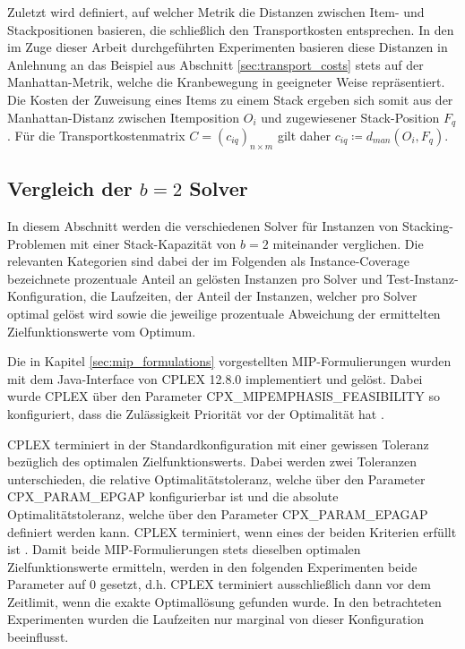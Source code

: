 Zuletzt wird definiert, auf welcher Metrik die Distanzen zwischen Item- und Stackpositionen
basieren, die schließlich den Transportkosten entsprechen.
In den im Zuge dieser Arbeit durchgeführten Experimenten basieren diese Distanzen in Anlehnung an das Beispiel
aus Abschnitt \ref{sec:transport_costs} stets auf der Manhattan-Metrik, welche die Kranbewegung in geeigneter Weise repräsentiert. Die Kosten der Zuweisung eines Items zu einem Stack ergeben sich somit aus der Manhattan-Distanz zwischen Itemposition $O_i$ und zugewiesener Stack-Position $F_q$. Für die Transportkostenmatrix $C = (c_{iq})_{n \times m}$ gilt
daher $c_{iq} \coloneqq d_{man}(O_i, F_q)$.

\subsection{Vergleich der $b = 2$ Solver}
\label{sec:solver_comp_b=2}

In diesem Abschnitt werden die verschiedenen Solver für Instanzen von Stacking-Problemen mit einer Stack-Kapazität von $b=2$ miteinander verglichen. Die relevanten Kategorien sind dabei der im Folgenden als Instance-Coverage bezeichnete prozentuale Anteil an gelösten Instanzen pro Solver und Test-Instanz-Konfiguration, die Laufzeiten, der Anteil der Instanzen, welcher pro Solver optimal gelöst wird
sowie die jeweilige prozentuale Abweichung der ermittelten Zielfunktionswerte vom Optimum.

Die in Kapitel \ref{sec:mip_formulations} vorgestellten MIP-Formulierungen wurden mit dem Java-Interface von CPLEX 12.8.0 implementiert
und gelöst. Dabei wurde CPLEX über den Parameter \textsc{CPX\_MIPEMPHASIS\_FEASIBILITY} so konfiguriert, dass die Zulässigkeit
Priorität vor der Optimalität hat \cite{IBM_DOC}.

CPLEX terminiert in der Standardkonfiguration mit einer gewissen Toleranz bezüglich des optimalen Zielfunktionswerts.
Dabei werden zwei Toleranzen unterschieden, die relative Optimalitätstoleranz, welche über den Parameter
\textsc{CPX\_PARAM\_EPGAP} konfigurierbar ist und die absolute Optimalitätstoleranz, welche über den Parameter
\textsc{CPX\_PARAM\_EPAGAP} definiert werden kann. CPLEX terminiert, wenn eines der beiden Kriterien erfüllt ist \cite{CPLEX2015}.
Damit beide MIP-Formulierungen stets dieselben optimalen Zielfunktionswerte ermitteln, werden in den folgenden
Experimenten beide Parameter auf $0$ gesetzt, d.h. CPLEX terminiert ausschließlich dann vor dem Zeitlimit,
wenn die exakte Optimallösung gefunden wurde. In den betrachteten Experimenten wurden die Laufzeiten nur marginal
von dieser Konfiguration beeinflusst.


